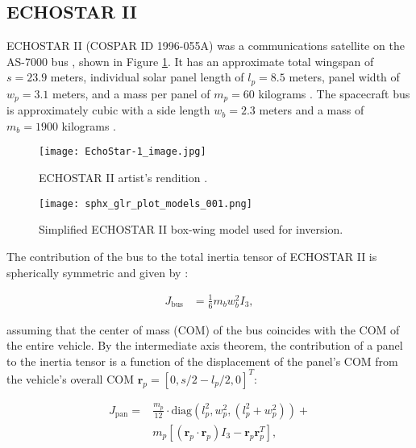 \documentclass[a4paper,twocolumn]{spaceDebrisC} %
\newcommand{\vctr}[1]{\bm{#1}}
\newcommand{\figbig}[0]{0.5\textwidth}
\begin{document}
\subsection{ECHOSTAR II}

ECHOSTAR II (COSPAR ID 1996-055A) was a communications satellite on the AS-7000 bus \cite{as7000_astronautix}, shown in Figure \ref{fig:echostar1}. It has an approximate total wingspan of $s = 23.9$ meters, individual solar panel length of $l_p=8.5$ meters, panel width of $w_p=3.1$ meters, and a mass per panel of $m_p = 60$ kilograms \cite{earl2015}. The spacecraft bus is approximately cubic with a side length $w_b=2.3$ meters and a mass of $m_b = 1900$ kilograms \cite{earl2015}.

\begin{figure}[H]
  \centering
  \texttt{[image: EchoStar-1\_image.jpg]}
  \caption{ECHOSTAR II artist's rendition \cite{as7000_astronautix}.}
  \label{fig:echostar1}
\end{figure}

\begin{figure}[H]
  \centering
  \texttt{[image: sphx\_glr\_plot\_models\_001.png]}
  \caption{Simplified ECHOSTAR II box-wing model used for inversion.}
  \label{fig:echostar1_simple}
\end{figure}

The contribution of the bus to the total inertia tensor of ECHOSTAR II is spherically symmetric and given by \cite{satterly1958}:

\begin{align}
 J_\text{bus} &= \frac{1}{6} m_b w_b^2 I_3,
\end{align}

\noindent
assuming that the center of mass (COM) of the bus coincides with the COM of the entire vehicle. By the intermediate axis theorem, the contribution of a panel to the inertia tensor is a function of the displacement of the panel's COM from the vehicle's overall COM $\vctr{r}_p = [ 0, s/2 - l_p/2, 0]^T$:

\begin{equation}
  \begin{split}
 J_\text{pan} = &\frac{m_p}{12} \cdot \text{diag}\left(l_p^2, w_p^2, \left(l_p^2 + w_p^2\right) \right) + \\&m_p \left[ \left( \vctr{r}_p \cdot \vctr{r}_p \right) I_3 - \vctr{r}_p \vctr{r}_p^T \right],
  \end{split}
\end{equation}
\end{document}
